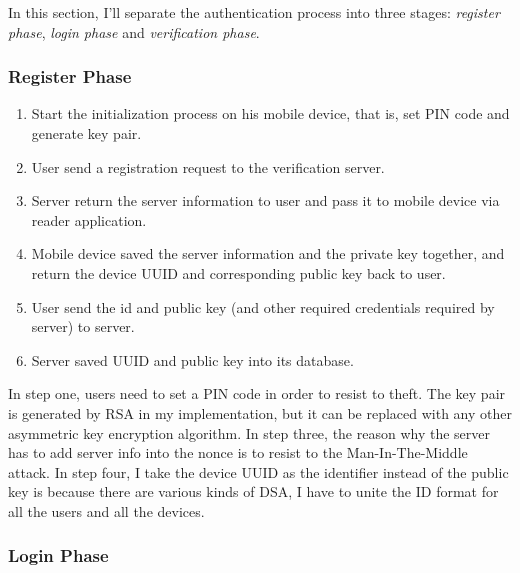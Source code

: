 \begin{CJK}{Bg5}{bsmi}
In this section, I'll separate the authentication process into three stages: \emph{register phase}, \emph{login phase} and \emph{verification phase}.

\subsubsection{Register Phase}

\begin{enumerate}
\item Start the initialization process on his mobile device, that is, set PIN code and generate key pair.
\item User send a registration request to the verification server.
\item Server return the server information to user and pass it to mobile device via reader application.
\item Mobile device saved the server information and the private key together, and return the device UUID and corresponding public key back to user.
\item User send the id and public key (and other required credentials required by server) to server.
\item Server saved UUID and public key into its database.
\end{enumerate}

In step one, users need to set a PIN code in order to resist to theft. The key pair is generated by RSA in my implementation, but it can be replaced with any other asymmetric key encryption algorithm. In step three, the reason why the server has to add server info into the nonce is to resist to the Man-In-The-Middle attack. In step four, I take the device UUID as the identifier instead of the public key is because there are various kinds of DSA, I have to unite the ID format for all the users and all the devices.

\subsubsection{Login Phase}


\end{CJK}
